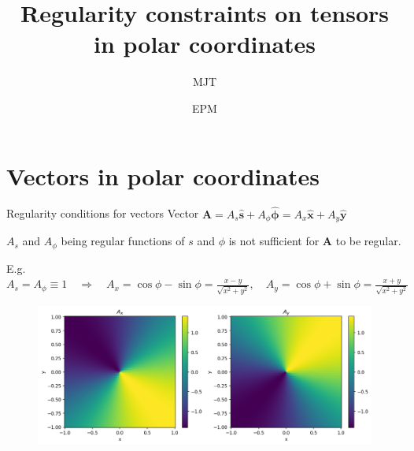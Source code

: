 \documentclass[11pt,aspectratio=169]{beamer}
\title{Regularity constraints on tensors in polar coordinates}
\date[Aug 2023]{EPM }
\author{MJT}
\institute{EPM}
\begin{document}

\titleframe




\section{Vectors in polar coordinates}

\begin{frame}{Regularity conditions for vectors}
	Vector $\mathbf{A} = A_s \hat{\mathbf{s}} + A_\phi \hat{\bm{\phi}} = A_x \hat{\mathbf{x}} + A_y \hat{\mathbf{y}}$

	$A_s$ and $A_\phi$ being regular functions of $s$ and $\phi$ is not sufficient for $\mathbf{A}$ to be regular.
	\vspace{1em}

	E.g. $A_s = A_\phi \equiv 1 \quad \Longrightarrow \quad A_x = \cos\phi - \sin\phi = \frac{x - y}{\sqrt{x^2 + y^2}},\quad A_y = \cos\phi + \sin\phi = \frac{x + y}{\sqrt{x^2 + y^2}}$

	\begin{figure}
		\centering
		\includegraphics[width=.75\linewidth]{./elements/singular_field.png}
	\end{figure}
\end{frame}
\end{document}

